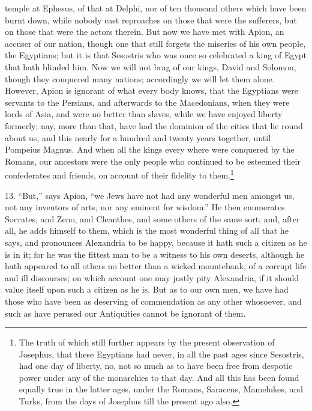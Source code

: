 temple at Ephesus, of that at Delphi, nor of ten thousand others which
have been burnt down, while nobody cast reproaches on those that were the
sufferers, but on those that were the actors therein. But now we have met
with Apion, an accuser of our nation, though one that still forgets the
miseries of his own people, the Egyptians; but it is that Sesostris who
was once so celebrated a king of Egypt that hath blinded him. Now we will
not brag of our kings, David and Solomon, though they conquered many
nations; accordingly we will let them alone. However, Apion is ignorant of
what every body knows, that the Egyptians were servants to the Persians,
and afterwards to the Macedonians, when they were lords of Asia, and were
no better than slaves, while we have enjoyed liberty formerly; nay, more
than that, have had the dominion of the cities that lie round about us,
and this nearly for a hundred and twenty years together, until Pompeius
Magnus. And when all the kings every where were conquered by the Romans,
our ancestors were the only people who continued to be esteemed their
confederates and friends, on account of their fidelity to them.\footnote{The truth of which still
further appears by the present observation of Josephus, that these
Egyptians had never, in all the past ages since Sesostris, had one day of
liberty, no, not so much as to have been free from despotic power under
any of the monarchies to that day. And all this has been found equally
true in the latter ages, under the Romans, Saracens, Mamelukes, and Turks,
from the days of Josephus till the present ago also.}

13. ``But,'' says Apion, ``we Jews have not had any wonderful men amongst us,
not any inventors of arts, nor any eminent for wisdom.'' He then enumerates
Socrates, and Zeno, and Cleanthes, and some others of the same sort; and,
after all, he adds himself to them, which is the most wonderful thing of
all that he says, and pronounces Alexandria to be happy, because it hath
such a citizen as he is in it; for he was the fittest man to be a witness
to his own deserts, although he hath appeared to all others no better than
a wicked mountebank, of a corrupt life and ill discourses; on which
account one may justly pity Alexandria, if it should value itself upon
such a citizen as he is. But as to our own men, we have had those who have
been as deserving of commendation as any other whosoever, and such as have
perused our Antiquities cannot be ignorant of them.

